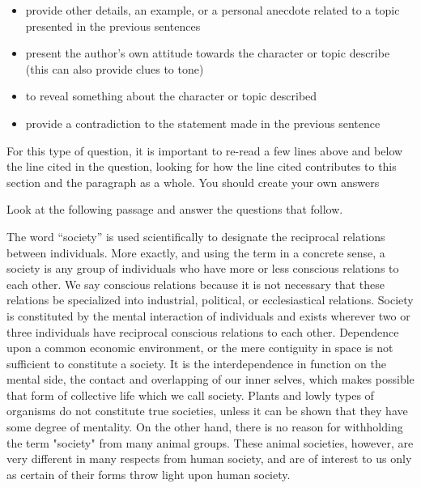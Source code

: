 \bigskip
\begin{itemize}
\item provide other details, an example, or a personal anecdote related to a topic presented in the previous sentences

\bigskip
\item present the author's own attitude towards the character or topic describe (this can also provide clues to tone)

\bigskip
\item to reveal something about the character or topic described

\bigskip
\item provide a contradiction to the statement made in the previous sentence
\end{itemize}

\bigskip
For this type of question, it is important to re-read a few lines above and below the line cited in the question, looking for how the line cited contributes to this section and the paragraph as a whole. You should create your own answers

\bigskip
Look at the following passage and answer the questions that follow. 

\bigskip
\begin{linenumbers*}
\modulolinenumbers[5]
The word ``society'' is used scientifically to designate the reciprocal relations between individuals. More exactly, and using the term in a concrete sense, a society is any group of individuals who have more or less conscious relations to each other. We say conscious relations because it is not necessary that these relations be specialized into industrial, political, or ecclesiastical relations. Society is constituted by the mental interaction of individuals and exists wherever two or three individuals have reciprocal conscious relations to each other. Dependence upon a common economic environment, or the mere contiguity in space is not sufficient to constitute a society. It is the interdependence in function on the mental side, the contact and overlapping of our inner selves, which makes possible that form of collective life which we call society. Plants and lowly types of organisms do not constitute true societies, unless it can be shown that they have some degree of mentality. On the other hand, there is no reason for withholding the term "society" from many animal groups. These animal societies, however, are very different in many respects from human society, and are of interest to us only as certain of their forms throw light upon human society.
\end{linenumbers*}

